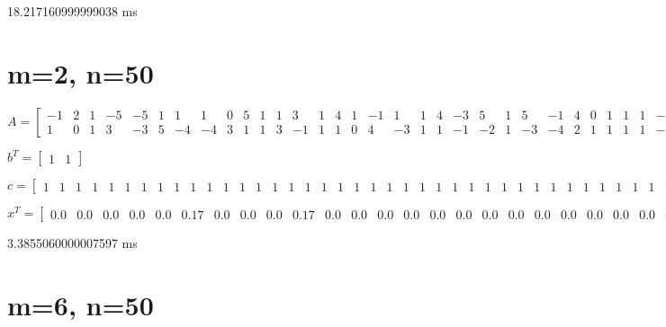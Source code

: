 \documentclass[8pt]{article}
\begin{document}
18.217160999999038  ms


\section{ m=2, n=50 }



\tiny
$ A =
\begin{bmatrix}
 -1  &  2  &  1  & -5  & -5  &  1  &  1  &  1  &  0  &  5  &  1  &  1  &  3  &  1  &  4  &  1  & -1  &  1  &  1  &  4  & -3  &  5  &  1  &  5  & -1  &  4  &  0  &  1  &  1  &  1  & -2  &  1  & -1  & -3  &  1  &  5  &  1  &  1  & -2  & -3  & -5  &  1  &  1  &  1  &  1  &  1  & -5  & -1  &  2  & -1 \\
  1  &  0  &  1  &  3  & -3  &  5  & -4  & -4  &  3  &  1  &  1  &  3  & -1  &  1  &  1  &  0  &  4  & -3  &  1  &  1  & -1  & -2  &  1  & -3  & -4  &  2  &  1  &  1  &  1  &  1  & -3  &  1  &  1  &  3  &  3  &  1  & -4  &  1  &  1  & -4  &  1  &  4  &  2  &  1  &  1  & -1  &  5  &  1  &  0  & -4 
\end{bmatrix}
$


\tiny
$ b^T =
\begin{bmatrix}
  1  &  1 
\end{bmatrix}
$


\tiny
$ c =
\begin{bmatrix}
  1  &  1  &  1  &  1  &  1  &  1  &  1  &  1  &  1  &  1  &  1  &  1  &  1  &  1  &  1  &  1  &  1  &  1  &  1  &  1  &  1  &  1  &  1  &  1  &  1  &  1  &  1  &  1  &  1  &  1  &  1  &  1  &  1  &  1  &  1  &  1  &  1  &  1  &  1  &  1  &  1  &  1  &  1  &  1  &  1  &  1  &  1  &  1  &  1  &  1 
\end{bmatrix}
$


\tiny
$ x^T =
\begin{bmatrix}
  0.0 &  0.0 &  0.0 &  0.0 &  0.0 &  0.17 &  0.0 &  0.0 &  0.0 &  0.17 &  0.0 &  0.0 &  0.0 &  0.0 &  0.0 &  0.0 &  0.0 &  0.0 &  0.0 &  0.0 &  0.0 &  0.0 &  0.0 &  0.0 &  0.0 &  0.0 &  0.0 &  0.0 &  0.0 &  0.0 &  0.0 &  0.0 &  0.0 &  0.0 &  0.0 &  0.0 &  0.0 &  0.0 &  0.0 &  0.0 &  0.0 &  0.0 &  0.0 &  0.0 &  0.0 &  0.0 &  0.0 &  0.0 &  0.0 &  0.0
\end{bmatrix}
$


3.3855060000007597  ms


\section{ m=6, n=50 }
\end{document}
